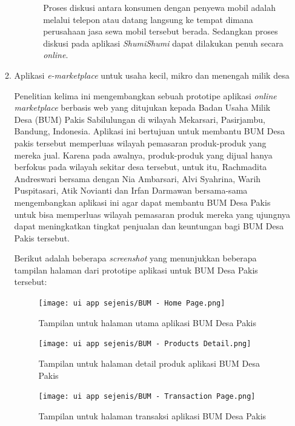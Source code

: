 \documentclass[a4paper]{article}
\begin{document}
\begin{itemize}
\begin{enumerate}
\begin{itemize}
\begin{itemize}
                Proses diskusi antara konsumen dengan penyewa mobil adalah melalui telepon atau datang langsung ke tempat dimana perusahaan jasa sewa mobil tersebut berada. Sedangkan proses diskusi pada aplikasi \textit{ShumiShumi} dapat dilakukan penuh secara \textit{online}.
    
            \end{itemize}
    
        \end{itemize}
    
        \item Aplikasi \textit{e-marketplace} untuk usaha kecil, mikro dan menengah milik desa
    
        Penelitian kelima ini mengembangkan sebuah prototipe aplikasi \textit{online marketplace} berbasis web yang ditujukan kepada Badan Usaha Milik Desa (BUM) Pakis Sabilulungan di wilayah Mekarsari, Pasirjambu, Bandung, Indonesia. Aplikasi ini bertujuan untuk membantu BUM Desa pakis tersebut memperluas wilayah pemasaran produk-produk yang mereka jual. Karena pada awalnya, produk-produk yang dijual hanya berfokus pada wilayah sekitar desa tersebut, untuk itu, Rachmadita Andreswari bersama dengan Nia Ambarsari, Alvi Syahrina, Warih Puspitasari, Atik Novianti dan Irfan Darmawan bersama-sama mengembangkan aplikasi ini agar dapat membantu BUM Desa Pakis untuk bisa memperluas wilayah pemasaran produk mereka yang ujungnya dapat meningkatkan tingkat penjualan dan keuntungan bagi BUM Desa Pakis tersebut\autocite{bum-mekarsari}.
    
        \newpage
        Berikut adalah beberapa \textit{screenshot} yang menunjukkan beberapa tampilan halaman dari prototipe aplikasi untuk BUM Desa Pakis tersebut:
    
        \begin{figure}[h]
            \centering
            \texttt{[image: ui app sejenis/BUM - Home Page.png]}
            \caption{Tampilan untuk halaman utama aplikasi BUM Desa Pakis}
        \end{figure}
    
        \begin{figure}[h]
            \centering
            \texttt{[image: ui app sejenis/BUM - Products Detail.png]}
            \caption{Tampilan untuk halaman detail produk aplikasi BUM Desa Pakis}
        \end{figure}
        \begin{figure}[h]
            \centering
            \texttt{[image: ui app sejenis/BUM - Transaction Page.png]}
            \caption{Tampilan untuk halaman transaksi aplikasi BUM Desa Pakis}
        \end{figure}
    

\end{enumerate}
\end{itemize}
\end{document}
